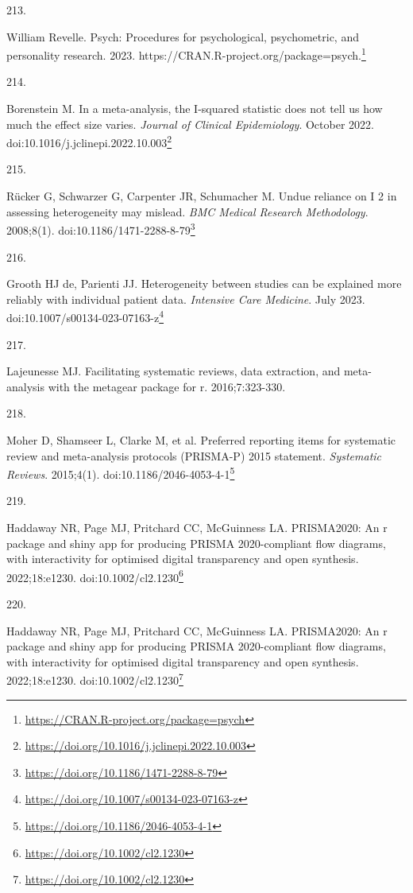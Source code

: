 \documentclass[
  a4paper,
]{book}
\newlength{\cslhangindent}
\newlength{\csllabelwidth}
\newlength{\cslentryspacingunit} %
\newenvironment{CSLReferences}[2] %
 {%
  \setlength{\parindent}{0pt}
  \ifodd #1
  \let\oldpar\par
  \def\par{\hangindent=\cslhangindent\oldpar}
  \fi
  \setlength{\parskip}{#2\cslentryspacingunit}
 }%
 {}
\newcommand{\CSLLeftMargin}[1]{\parbox[t]{\csllabelwidth}{#1}}
\newcommand{\CSLRightInline}[1]{\parbox[t]{\linewidth - \csllabelwidth}{#1}\break}
\renewcommand{\href}[2]{#2\footnote{\url{#1}}}
\begin{document}
\begin{CSLReferences}{0}{0}
\leavevmode{}%
\CSLLeftMargin{213. }%
\CSLRightInline{William Revelle. Psych: Procedures for psychological, psychometric, and personality research. 2023. \href{https://CRAN.R-project.org/package=psych}{https://CRAN.R-project.org/package=psych.}}

\leavevmode{}%
\CSLLeftMargin{214. }%
\CSLRightInline{Borenstein M. In a meta-analysis, the I-squared statistic does not tell us how much the effect size varies. \emph{Journal of Clinical Epidemiology}. October 2022. doi:\href{https://doi.org/10.1016/j.jclinepi.2022.10.003}{10.1016/j.jclinepi.2022.10.003}}

\leavevmode{}%
\CSLLeftMargin{215. }%
\CSLRightInline{Rücker G, Schwarzer G, Carpenter JR, Schumacher M. Undue reliance on I 2 in assessing heterogeneity may mislead. \emph{BMC Medical Research Methodology}. 2008;8(1). doi:\href{https://doi.org/10.1186/1471-2288-8-79}{10.1186/1471-2288-8-79}}

\leavevmode{}%
\CSLLeftMargin{216. }%
\CSLRightInline{Grooth HJ de, Parienti JJ. Heterogeneity between studies can be explained more reliably with individual patient data. \emph{Intensive Care Medicine}. July 2023. doi:\href{https://doi.org/10.1007/s00134-023-07163-z}{10.1007/s00134-023-07163-z}}

\leavevmode{}%
\CSLLeftMargin{217. }%
\CSLRightInline{Lajeunesse MJ. Facilitating systematic reviews, data extraction, and meta-analysis with the metagear package for r. 2016;7:323-330.}

\leavevmode{}%
\CSLLeftMargin{218. }%
\CSLRightInline{Moher D, Shamseer L, Clarke M, et al. Preferred reporting items for systematic review and meta-analysis protocols (PRISMA-P) 2015 statement. \emph{Systematic Reviews}. 2015;4(1). doi:\href{https://doi.org/10.1186/2046-4053-4-1}{10.1186/2046-4053-4-1}}

\leavevmode{}%
\CSLLeftMargin{219. }%
\CSLRightInline{Haddaway NR, Page MJ, Pritchard CC, McGuinness LA. PRISMA2020: An r package and shiny app for producing PRISMA 2020-compliant flow diagrams, with interactivity for optimised digital transparency and open synthesis. 2022;18:e1230. doi:\href{https://doi.org/10.1002/cl2.1230}{10.1002/cl2.1230}}

\leavevmode{}%
\CSLLeftMargin{220. }%
\CSLRightInline{Haddaway NR, Page MJ, Pritchard CC, McGuinness LA. PRISMA2020: An r package and shiny app for producing PRISMA 2020-compliant flow diagrams, with interactivity for optimised digital transparency and open synthesis. 2022;18:e1230. doi:\href{https://doi.org/10.1002/cl2.1230}{10.1002/cl2.1230}}


\end{CSLReferences}
\end{document}
